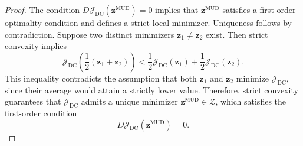 \documentclass[final,1p,times]{elsarticle}
\begin{document}
\begin{proof}
The condition $ D\mathcal{J}_{\mathrm{DC}}(\mathbf{z}^{\text{MUD}}) = 0 $ implies that $ \mathbf{z}^{\text{MUD}} $ satisfies a first-order optimality condition and defines a strict local minimizer.
Uniqueness follows by contradiction. Suppose two distinct minimizers $ \mathbf{z}_1 \neq \mathbf{z}_2 $ exist. Then strict convexity implies
\begin{equation}
\mathcal{J}_{\mathrm{DC}} \left( \frac{1}{2}(\mathbf{z}_1 + \mathbf{z}_2) \right) < \frac{1}{2} \mathcal{J}_{\mathrm{DC}}(\mathbf{z}_1) + \frac{1}{2} \mathcal{J}_{\mathrm{DC}}(\mathbf{z}_2).
\end{equation}
This inequality contradicts the assumption that both $ \mathbf{z}_1 $ and $ \mathbf{z}_2 $ minimize $ \mathcal{J}_{\mathrm{DC}} $, since their average would attain a strictly lower value. Therefore, strict convexity guarantees that $ \mathcal{J}_{\mathrm{DC}} $ admits a unique minimizer $ \mathbf{z}^{\text{MUD}} \in \mathcal{Z} $, which satisfies the first-order condition
\begin{equation}
D\mathcal{J}_{\mathrm{DC}}(\mathbf{z}^{\text{MUD}}) = 0.
\end{equation}
\end{proof}
\end{document}
